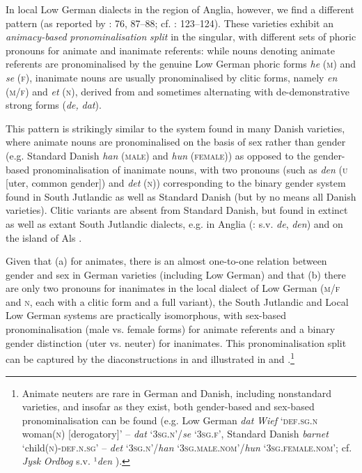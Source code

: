 \documentclass[output=paper]{langsci/langscibook}
\begin{document}
In local Low German dialects in the region of Anglia, however, we find a different pattern (as reported by \citealt{Bock.1933}: 76, 87–88; cf. \citealt{Hoder.2016a}: 123--124). These varieties exhibit an \textit{animacy-based} \textit{pronominalisation} \textit{split} in the singular, with different sets of phoric{} pronouns for animate and inanimate referents: while nouns denoting animate referents are pronominalised by the genuine Low German phoric forms \textit{he} (\textsc{m}) and \textit{se} (\textsc{f}), inanimate nouns are usually pronominalised by clitic forms, namely \textit{en} (\textsc{m/f}) and \textit{et} (\textsc{n}), derived from and sometimes alternating with de-demonstrative strong forms (\textit{de,} \textit{dat}).

This pattern is strikingly similar to the system found in many Danish varieties, where animate nouns are pronominalised on the basis of sex rather than gender (e.g. Standard Danish \textit{han} (\textsc{male}) and \textit{hun} (\textsc{female})) as opposed to the gender-based pronominalisation of inanimate nouns, with two pronouns (such as \textit{den} (\textsc{u} {[}uter, common gender{]}) and \textit{det} (\textsc{n})) corresponding to the binary gender system found in South Jutlandic as well as Standard Danish (but by no means all Danish varieties). Clitic variants are absent from Standard Danish, but found in extinct as well as extant South Jutlandic dialects, e.g. in Anglia (\citealt{JulNielsen.1995}: s.v. \textit{de}, \textit{den}) and on the island of Als \citep[24]{Jorgensen.1950}.

Given that (a) for animates, there is an almost one-to-one relation between gender and sex in German varieties (including Low German) and that (b) there are only two pronouns for inanimates in the local dialect of Low German (\textsc{m/f} and \textsc{n}, each with a clitic form and a full variant), the South Jutlandic and Local Low German systems are practically isomorphous, with sex-based pronominalisation (male vs. female forms) for animate referents and a binary gender distinction (uter vs. neuter) for inanimates. This pronominalisation split{} can be{} captured by the diaconstructions in  and illustrated in  and .\footnote{Animate neuters are rare in German and Danish, including nonstandard varieties, and insofar as they exist, both gender-based and sex-based pronominalisation can be found (e.g. Low German \textit{dat} \textit{Wief} ‘\textsc{def.sg.n} woman(\textsc{n}) {[}derogatory{]}’ – \textit{dat} ‘\textsc{3sg.n}’/\textit{se} ‘\textsc{3sg.f}’, Standard Danish \textit{barnet} ‘child(\textsc{n})-\textsc{def.n.sg’} – \textit{det} ‘\textsc{3sg.n}’/\textit{han} ‘\textsc{3sg.male.nom}’/\textit{hun} ‘\textsc{3sg.female.nom}’; cf. \textit{Jysk} \textit{Ordbog} s.v. ¹\textit{den} ).}
\end{document}
